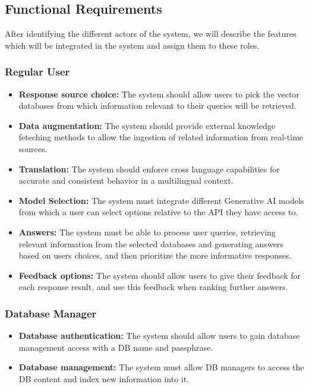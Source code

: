 \subsection{Functional Requirements}
After identifying the different actors of the system, we will describe the features which will be integrated in the system and assign them to these roles.
\subsubsection{Regular User}
\begin{itemize}
    \item \textbf{Response source choice:} The system should allow users to pick the vector databases from which information relevant to their queries will be retrieved.
    \item \textbf{Data augmentation:} The system should provide external knowledge feteching methods to allow the ingestion of related information from real-time sources.
    \item \textbf{Translation:} The system should enforce cross language capabilities for accurate and consistent behavior in a multilingual context.
    \item \textbf{Model Selection:} The system must integrate different Generative AI models from which a user can select options relative to the API they have access to.
    \item \textbf{Answers:} The system must be able to process user queries, retrieving relevant information from the selected databases and generating answers based on users choices, and then prioritize the more informative responses.
    \item \textbf{Feedback options:} The system should allow users to give their feedback for each response result, and use this feedback when ranking further answers.
\end{itemize}
\subsubsection{Database Manager}
\begin{itemize}
    \item \textbf{Database authentication:} The system should allow users to gain database management access with a DB name and passphrase.
    \item \textbf{Database management:} The system must allow DB managers to access the DB content and index new information into it.
\end{itemize}
